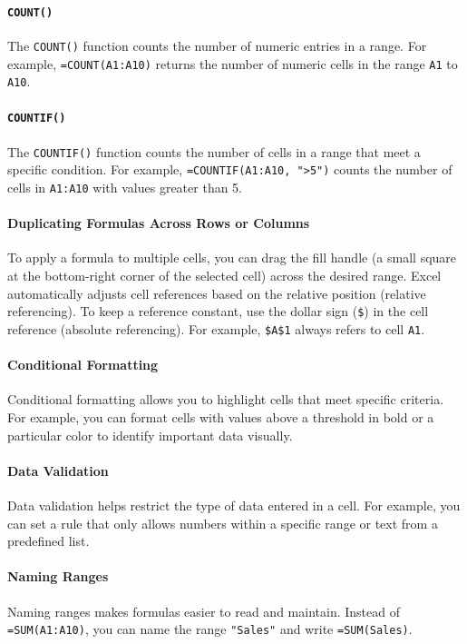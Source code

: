 \paragraph{\texttt{COUNT()}}
The \texttt{COUNT()} function counts the number of numeric entries in a range. For example, \texttt{=COUNT(A1:A10)} returns the number of numeric cells in the range \texttt{A1} to \texttt{A10}.

\paragraph{\texttt{COUNTIF()}}
The \texttt{COUNTIF()} function counts the number of cells in a range that meet a specific condition. For example, \texttt{=COUNTIF(A1:A10, ">5")} counts the number of cells in \texttt{A1:A10} with values greater than 5.

\paragraph{Duplicating Formulas Across Rows or Columns}
To apply a formula to multiple cells, you can drag the fill handle (a small square at the bottom-right corner of the selected cell) across the desired range. Excel automatically adjusts cell references based on the relative position (relative referencing). To keep a reference constant, use the dollar sign (\texttt{\$}) in the cell reference (absolute referencing). For example, \texttt{\$A\$1} always refers to cell \texttt{A1}.

\paragraph{Conditional Formatting}
Conditional formatting allows you to highlight cells that meet specific criteria. For example, you can format cells with values above a threshold in bold or a particular color to identify important data visually.

\paragraph{Data Validation}
Data validation helps restrict the type of data entered in a cell. For example, you can set a rule that only allows numbers within a specific range or text from a predefined list.

\paragraph{Naming Ranges}
Naming ranges makes formulas easier to read and maintain. Instead of \texttt{=SUM(A1:A10)}, you can name the range \texttt{"Sales"} and write \texttt{=SUM(Sales)}.

